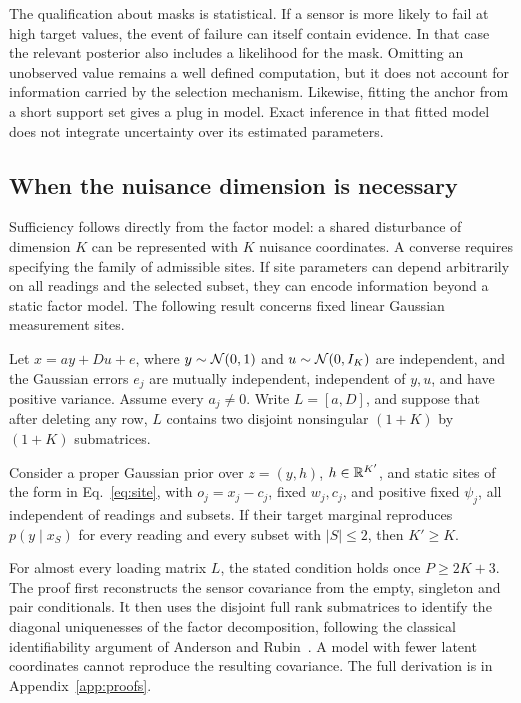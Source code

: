 The qualification about masks is statistical. If a sensor is more likely to fail at high target values, the event of failure can itself contain evidence. In that case the relevant posterior also includes a likelihood for the mask. Omitting an unobserved value remains a well defined computation, but it does not account for information carried by the selection mechanism. Likewise, fitting the anchor from a short support set gives a plug in model. Exact inference in that fitted model does not integrate uncertainty over its estimated parameters.

\subsection{When the nuisance dimension is necessary}

Sufficiency follows directly from the factor model: a shared disturbance of dimension \(K\) can be represented with \(K\) nuisance coordinates. A converse requires specifying the family of admissible sites. If site parameters can depend arbitrarily on all readings and the selected subset, they can encode information beyond a static factor model. The following result concerns fixed linear Gaussian measurement sites.

\begin{proposition}
\label{prop:rank}
Let \(x=ay+Du+e\), where \(y\sim\mathcal{N}(0,1)\) and \(u\sim\mathcal{N}(0,I_K)\) are independent, and the Gaussian errors \(e_j\) are mutually independent, independent of \(y,u\), and have positive variance. Assume every \(a_j\ne0\). Write \(L=[a,D]\), and suppose that after deleting any row, \(L\) contains two disjoint nonsingular \((1+K)\) by \((1+K)\) submatrices.

Consider a proper Gaussian prior over \(z=(y,h)\), \(h\in\mathbb{R}^{K'}\), and static sites of the form in Eq.~\eqref{eq:site}, with \(o_j=x_j-c_j\), fixed \(w_j,c_j\), and positive fixed \(\psi_j\), all independent of readings and subsets. If their target marginal reproduces \(p(y\mid x_S)\) for every reading and every subset with \(|S|\le2\), then \(K'\ge K\).
\end{proposition}

For almost every loading matrix \(L\), the stated condition holds once \(P\ge2K+3\). The proof first reconstructs the sensor covariance from the empty, singleton and pair conditionals. It then uses the disjoint full rank submatrices to identify the diagonal uniquenesses of the factor decomposition, following the classical identifiability argument of Anderson and Rubin~\citep{anderson1956statistical}. A model with fewer latent coordinates cannot reproduce the resulting covariance. The full derivation is in Appendix~\ref{app:proofs}.

